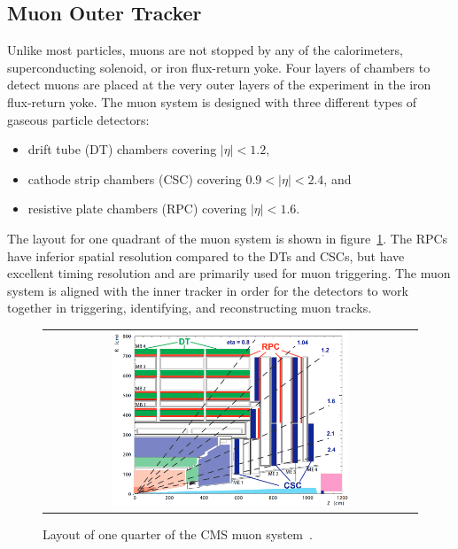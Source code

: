 \subsection{Muon Outer Tracker}
Unlike most particles, muons are not stopped by any of the calorimeters, superconducting solenoid, or iron flux-return yoke. 
Four layers of chambers to detect muons are placed at the very outer layers of the experiment in the iron flux-return yoke. 
The muon system is designed with three different types of gaseous particle detectors: 
\begin{itemize}
\item drift tube (DT) chambers covering $\vert \eta \vert < 1.2$,
\item cathode strip chambers (CSC) covering $0.9 < \vert \eta \vert < 2.4$, and
\item resistive plate chambers (RPC) covering $\vert \eta \vert < 1.6$.
\end{itemize}
The layout for one quadrant of the muon system is shown in figure~\ref{Muon_System}.
The RPCs have inferior spatial resolution compared to the DTs and CSCs, but have excellent timing resolution and are primarily used for muon triggering.
The muon system is aligned with the inner tracker in order for the detectors to work together in triggering, identifying, and reconstructing muon tracks.
\begin{figure}[!htb]
  \begin{center}
    \begin{tabular}{c}
        \includegraphics[width=0.65\textwidth]{fig_LHC_CMS/Muon_System.png}
    \end{tabular}
    \caption{Layout of one quarter of the CMS muon system~\cite{Bayatian:922757}.
            }
    \label{Muon_System}
  \end{center}
\end{figure}

